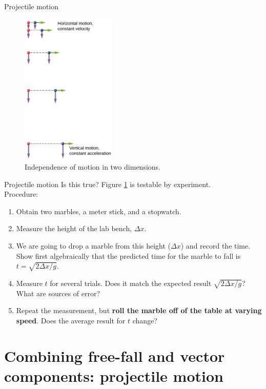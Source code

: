 \documentclass{beamer}
\begin{document}
\begin{frame}{Projectile motion}
\small
\begin{figure}
\centering
\includegraphics[width=0.4\textwidth]{figures/fall.png}
\caption{\label{fig:fall} Independence of motion in two dimensions.}
\end{figure}
\end{frame}

\begin{frame}{Projectile motion}
Is this true?  Figure \ref{fig:fall} is testable by experiment. \\
\vspace{0.5cm}
\small
Procedure:
\begin{enumerate}
\item Obtain two marbles, a meter stick, and a stopwatch.
\item Measure the height of the lab bench, $\Delta x$.
\item We are going to drop a marble from this height ($\Delta x$) and record the time.  Show first algebraically that the predicted time for the marble to fall is $t = \sqrt{2\Delta x/g}$.
\item Measure $t$ for several trials.  Does it match the expected result $\sqrt{2\Delta x/g}$?  What are sources of error?
\item Repeat the measurement, but \textbf{roll the marble off of the table at varying speed}.  Does the average result for $t$ change?
\end{enumerate}
\end{frame}

\section{Combining free-fall and vector components: projectile motion}
\end{document}
